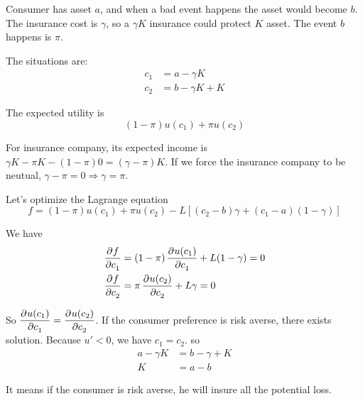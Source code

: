 \begin{example}[insurance]
    Consumer has asset $a$, and when a bad event happens the asset would become $b$. The insurance cost is $\gamma$, so a $\gamma K$ insurance could protect $K$ asset. The event $b$ happens is $\pi$.
    
    The situations are:
    \begin{equation}
        \begin{aligned}
            c_1 &= a - \gamma K \\
            c_2 &= b - \gamma K + K
        \end{aligned}
    \end{equation}
    
    The expected utility is 
    \begin{equation}
        (1-\pi)u(c_1) + \pi u(c_2)
    \end{equation}
    
    For insurance company, its expected income is $\gamma K - \pi K - (1-\pi)0 = (\gamma - \pi)K$. If we force the insurance company to be neutual, $\gamma - \pi = 0 \Rightarrow \gamma = \pi$.
    
    Let's optimize the Lagrange equation
    \begin{equation}
        f = (1-\pi)u(c_1) + \pi u(c_2) - L [(c_2 - b) \gamma + (c_1 - a) (1 - \gamma)]
    \end{equation}
    
    We have 
    \begin{equation}
        \begin{aligned}
            \dpd{f}{c_1} &= (1-\pi)\dpd{u(c_1)}{c_1} + L(1-\gamma) = 0\\
            \dpd{f}{c_2} &= \pi \dpd{u(c_2)}{c_2} + L\gamma = 0
        \end{aligned}
    \end{equation}
    
    So $\dpd{u(c_1)}{c_1} = \dpd{u(c_2)}{c_2}$. If the consumer preference is risk averse, there exists solution. Because $u' < 0$, we have $c_1 = c_2$. so
    \begin{equation}
        \begin{aligned}
            a - \gamma K &= b - \gamma + K \\
            K &= a - b
        \end{aligned}
    \end{equation}
    
    It means if the consumer is risk averse, he will insure all the potential loss.
\end{example}


